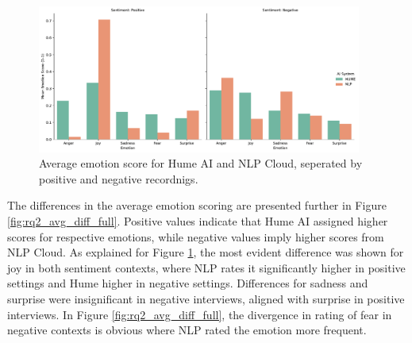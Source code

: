 \begin{figure}[!h]
    \centering 
    \includegraphics[width=0.95\textwidth]{png/results/rq2/sentiment_comparison_facet_all.pdf}
    \caption{Average emotion score for Hume AI and NLP Cloud, seperated by positive and negative recordnigs.}
    \label{fig:rq2_sent_grouped_bar}
\end{figure}

The differences in the average emotion scoring are presented further in Figure \ref{fig:rq2_avg_diff_full}. Positive values indicate that Hume AI assigned higher scores for respective emotions, while negative values imply higher scores from NLP Cloud. 
As explained for Figure \ref{fig:rq2_sent_grouped_bar}, the most evident difference was shown for joy in both sentiment contexts, where NLP rates it significantly higher in positive settings and Hume higher in negative settings. 
Differences for sadness and surprise were insignificant in negative interviews, aligned with surprise in positive interviews. 
In Figure \ref{fig:rq2_avg_diff_full}, the divergence in rating of fear in negative contexts is obvious where NLP rated the emotion more frequent. 

